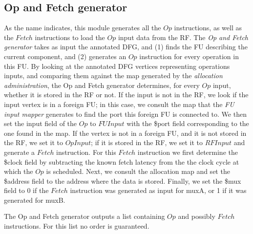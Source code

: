 \subsection*{Op and Fetch generator}
As the name indicates, this module generates all the $Op$ instructions, as well as the $Fetch$ instructions to load the $Op$ input data from the RF.
The \textit{Op and Fetch generator} takes as input the annotated DFG, and (1) finds the FU describing the current component, and (2) generates an $Op$ instruction for every operation in this FU.
By looking at the annotated DFG vertices representing operations inputs, and comparing them against the map generated by the \textit{allocation administration}, the Op and Fetch generator determines, for every $Op$ input, whether it is stored in the RF or not.
If the input is not in the RF, we look if the input vertex is in a foreign FU; in this case, we consult the map that the \textit{FU input mapper} generates to find the port this foreign FU is connected to.
We then set the input field of the $Op$ to $FUInput$ with the \$port field corresponding to the one found in the map. If the vertex is not in a foreign FU, and it is not stored in the RF, we set it to $OpInput$; if it is stored in the RF, we set it to $RFInput$ and generate a $Fetch$ instruction.
For this $Fetch$ instruction we first determine the \$clock field by subtracting the known fetch latency from the the clock cycle at which the $Op$ is scheduled. Next, we consult the allocation map and set the \$address field to the address where the data is stored. Finally, we set the \$mux field to 0 if the $Fetch$ instruction was generated as input for muxA, or 1 if it was generated for muxB.

The Op and Fetch generator outputs a list containing $Op$ and possibly $Fetch$ instructions. For this list no order is guaranteed.


